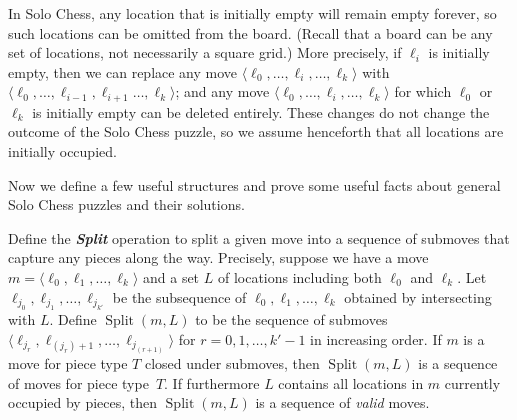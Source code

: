 \documentclass[11pt,letterpaper]{article}
\makeatletter
\def\defn#1{\textbf{\textit{\boldmath #1}}}
\newcommand{\BreakText}{Split}
\newcommand{\BreakFunc}{\operatorname{\BreakText}}
\newcommand{\Break}[2]{{\BreakFunc({#1}, {#2})}}
\theoremstyle{plain}
\theoremstyle{definition}
\theoremstyle{remark}
\gdef\xxx{\@ifnextchar[\xxx@lab\xxx@nolab}
\numberwithin{equation}{section}
\makeatother
\begin{document}
In Solo Chess, any location that is initially empty will remain empty forever,
so such locations can be omitted from the board.
(Recall that a board can be any set of locations, not necessarily a square grid.)
More precisely, if \(\ell_i\) is initially empty,
then we can replace any move
\(\langle \ell_0, \dots, \ell_i, \dots, \ell_k \rangle\)
with
\(\langle \ell_0, \dots, \ell_{i-1}, \ell_{i+1} \dots, \ell_k \rangle\);
and any move \(\langle \ell_0, \dots, \ell_i, \dots, \ell_k \rangle\)
for which \(\ell_0\) or \(\ell_k\) is initially empty
can be deleted entirely.
These changes do not change the outcome of the Solo Chess puzzle,
so we assume henceforth that all locations are initially occupied.

\medskip
Now we define a few useful structures and prove some useful facts
about general Solo Chess puzzles and their solutions.

Define the \defn{\BreakText} operation to split a given move into a sequence
of submoves that capture any pieces along the way.  Precisely,
suppose we have a move \(m = \langle \ell_0, \ell_1, \dots, \ell_k \rangle\)
and a set \(L\) of locations including both $\ell_0$ and $\ell_k$.
Let \(\ell_{j_0}, \ell_{j_1}, \ldots, \ell_{j_{k'}}\)
be the subsequence of \(\ell_0, \ell_1, \dots, \ell_k\)
obtained by intersecting with \(L\).
Define \(\Break{m}{L}\) to be the sequence of submoves
\(\langle \ell_{j_r}, \ell_{(j_r) + 1}, \ldots,
\ell_{j_{(r+1)}} \rangle\)
for \(r = 0, 1, \dots, k'-1\) in increasing order.
If \(m\) is a move for piece type $T$ closed under submoves,
then \(\Break{m}{L}\) is a sequence of moves for piece type~$T$.
If furthermore $L$ contains all locations in $m$ currently occupied by pieces,
then $\Break{m}{L}$ is a sequence of \emph{valid} moves.
\end{document}
